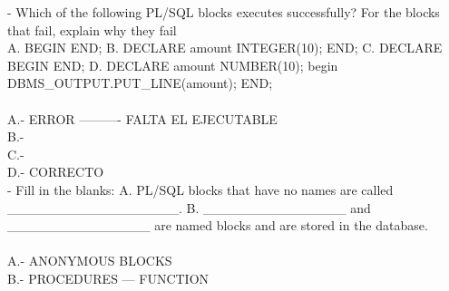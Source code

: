 \begin{enumerate}[1.]
	- Which of the following PL/SQL blocks executes successfully? For the blocks that fail, explain why they fail
	\\
	\subitem A. BEGIN
	\subitem    END;
	\subitem B. DECLARE
 	\subitem    amount INTEGER(10);
	\subitem    END;
	\subitem C. DECLARE
	 \subitem   BEGIN
	 \subitem   END;
	\subitem D. DECLARE
	 \subitem	amount NUMBER(10);
	 \subitem	begin
	 \subitem	DBMS\_OUTPUT.PUT\_LINE(amount);
	 \subitem	END;
	\\\\A.- ERROR ---------- FALTA EL EJECUTABLE
	\\B.-
	\\C.-
	\\D.- CORRECTO\\

	- Fill in the blanks:
	\subitem A. PL/SQL blocks that have no names are called \_\_\_\_\_\_\_\_\_\_\_\_\_\_\_\_\_\_.
	\subitem B. \_\_\_\_\_\_\_\_\_\_\_\_\_\_\_ and \_\_\_\_\_\_\_\_\_\_\_\_\_\_\_ are named blocks and are stored in the database.
	\\\\A.- ANONYMOUS BLOCKS
	\\B.- PROCEDURES --- FUNCTION

\end{enumerate}


